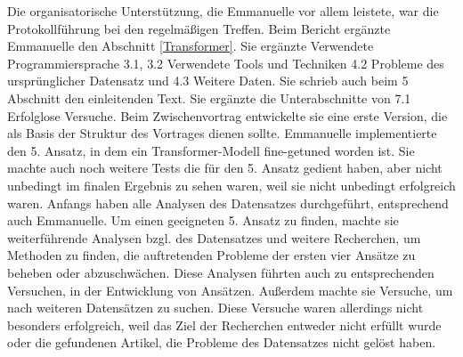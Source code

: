 Die organisatorische Unterstützung, die Emmanuelle vor allem leistete, war die Protokollführung bei den regelmäßigen Treffen. 
Beim Bericht ergänzte Emmanuelle den Abschnitt \ref{Transformer}. Sie ergänzte Verwendete Programmiersprache 3.1, 3.2 Verwendete Tools und Techniken 4.2 Probleme des ursprünglicher Datensatz und 4.3 Weitere Daten. Sie schrieb auch beim 5 Abschnitt den einleitenden Text. Sie ergänzte die Unterabschnitte von 7.1 Erfolglose Versuche.
Beim Zwischenvortrag entwickelte sie eine erste Version, die als Basis der Struktur des Vortrages dienen sollte. 
Emmanuelle implementierte den 5. Ansatz, in dem ein Transformer-Modell fine-getuned worden ist. Sie machte auch noch weitere Tests die für den 5. Ansatz gedient haben, aber nicht unbedingt im finalen Ergebnis zu sehen waren, weil sie nicht unbedingt erfolgreich waren.
Anfangs haben alle Analysen des Datensatzes durchgeführt, entsprechend auch Emmanuelle. Um einen geeigneten 5. Ansatz zu finden, machte sie weiterführende Analysen bzgl. des Datensatzes und weitere Recherchen, um Methoden zu finden, die auftretenden Probleme der ersten vier Ansätze zu beheben oder abzuschwächen. Diese Analysen führten auch zu entsprechenden Versuchen, in der Entwicklung von Ansätzen.
Außerdem machte sie Versuche, um nach weiteren Datensätzen zu suchen. %
Diese Versuche waren allerdings nicht besonders erfolgreich, weil das Ziel der Recherchen entweder nicht erfüllt wurde oder die gefundenen Artikel, die Probleme des Datensatzes nicht gelöst haben. 

